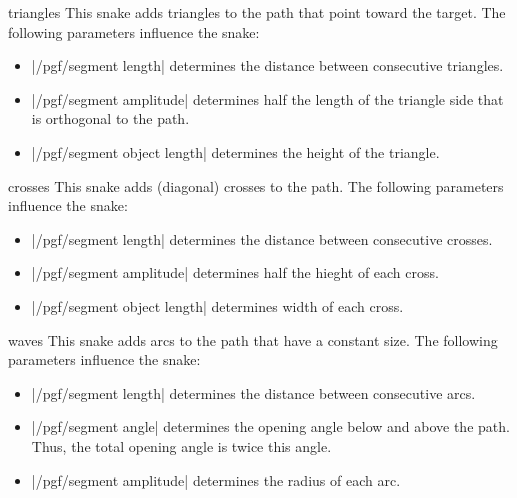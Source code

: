 \begin{snake}{triangles}
  This snake adds triangles to the path that point toward the
  target. The following parameters influence the snake: 
  \begin{itemize}
  \item |/pgf/segment length|
    determines the distance between consecutive triangles.
  \item |/pgf/segment amplitude|
    determines half the length of the triangle side that is orthogonal
    to the path.
  \item |/pgf/segment object length|
    determines the height of the triangle.
  \end{itemize}
\begin{codeexample}[]
\end{codeexample}
\end{snake}

\begin{snake}{crosses}
  This snake adds (diagonal) crosses to the path. The following
  parameters influence the snake:  
  \begin{itemize}
  \item |/pgf/segment length|
    determines the distance between consecutive crosses.
  \item |/pgf/segment amplitude|
    determines half the hieght of each cross.
  \item |/pgf/segment object length|
    determines width of each cross.
  \end{itemize}
\begin{codeexample}[]
\end{codeexample}
\end{snake}


\begin{snake}{waves}
  This snake adds arcs to the path that have a constant size. The
  following parameters influence the snake: 
  \begin{itemize}
  \item |/pgf/segment length|
    determines the distance between consecutive arcs.
  \item |/pgf/segment angle|
    determines the opening angle below and above the path. Thus, the
    total opening angle is twice this angle.
  \item |/pgf/segment amplitude|
    determines the radius of each arc.
  \end{itemize}
\begin{codeexample}[]
\end{codeexample}
\end{snake}


